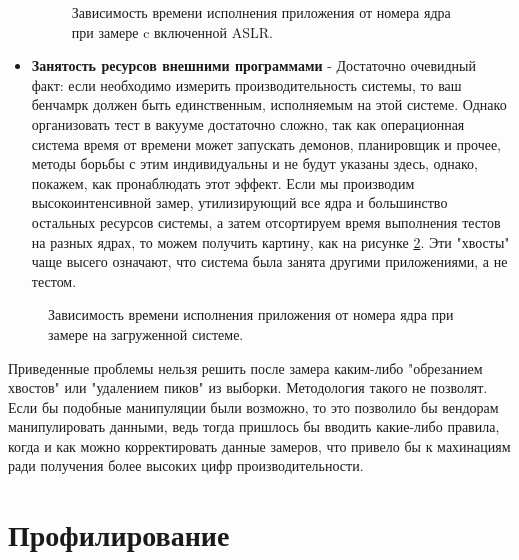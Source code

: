 \begin{itemize}
	\begin{figure}[ht]
		\caption{Зависимость времени исполнения приложения от номера ядра при замере c включенной ASLR.}\label{fig:peaks}
	\end{figure}
	\item \textbf{Занятость ресурсов внешними программами} - Достаточно очевидный факт: если необходимо измерить производительность системы, то ваш бенчамрк должен быть единственным, исполняемым на этой системе.  Однако организовать тест в вакууме достаточно сложно, так как операционная система время от времени может запускать демонов, планировщик и прочее,  методы борьбы с этим индивидуальны и не будут указаны здесь, однако, покажем, как пронаблюдать этот эффект. Если мы производим высокоинтенсивной замер, утилизирующий все ядра и большинство остальных ресурсов системы, а затем отсортируем время выполнения тестов на разных ядрах, то можем получить картину, как на рисунке \ref{fig:tails}. Эти "хвосты" чаще высего означают, что система была занята другими  приложениями, а не  тестом.
\end{itemize}


\begin{figure}[ht]
	\caption{Зависимость времени исполнения приложения от номера ядра при замере на загруженной системе.}\label{fig:tails}
\end{figure}



Приведенные проблемы нельзя решить после замера каким-либо "обрезанием хвостов" или "удалением пиков" из выборки. Методология такого не позволят. Если бы подобные манипуляции были возможно, то это позволило бы вендорам манипулировать данными, ведь тогда пришлось бы вводить какие-либо правила, когда и как можно корректировать данные замеров, что привело бы к махинациям ради получения более высоких цифр производительности.

\section {Профилирование}

